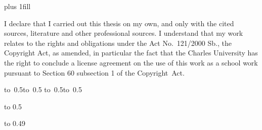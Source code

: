 \newpage


\openright
\hypersetup{pageanchor=true}
\vglue 0pt plus 1fill

\noindent
I declare that I carried out this \ThesisTypeName{} thesis on my own, and only with the cited
sources, literature and other professional sources.
I understand that my work relates to the rights and obligations under the Act No.~121/2000 Sb.,
the Copyright Act, as amended, in particular the fact that the Charles
University has the right to conclude a license agreement on the use of this
work as a school work pursuant to Section 60 subsection 1 of the Copyright~Act.

\vspace{10mm}

\hbox{\hbox to 0.5\hbox to 0.5\hsize{\dotfill\quad}}
\smallskip
\hbox{\hbox to 0.5\hsize{}\hbox to 0.5}

\vspace{20mm}
\newpage


\openright

\noindent
\Dedication

\newpage


\openright
{\InfoPageFont

\vtop to 0.5


\newpage

\ifx\StudyLanguage\LangCS

\vtop to 0.49

\fi

}

\newpage

\pagestyle{plain}
